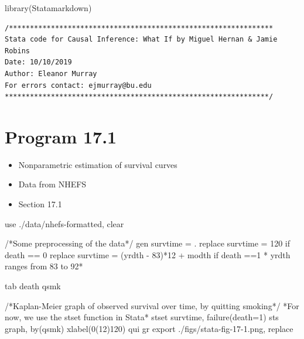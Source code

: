 \documentclass[
  10pt,
  a4paper,
]{book}
\newenvironment{Shaded}{\begin{snugshade}}{\end{snugshade}}
\newcommand{\CommentTok}[1]{\textcolor[rgb]{0.37,0.37,0.37}{#1}}
\newcommand{\FunctionTok}[1]{\textcolor[rgb]{0.28,0.35,0.67}{#1}}
\newcommand{\KeywordTok}[1]{\textcolor[rgb]{0.00,0.46,0.62}{#1}}
\newcommand{\NormalTok}[1]{\textcolor[rgb]{0.00,0.46,0.62}{#1}}
\providecommand{\tightlist}{%
  \setlength{\itemsep}{0pt}\setlength{\parskip}{0pt}}
\begin{document}
\begin{Shaded}
\begin{Highlighting}[]
\FunctionTok{library}\NormalTok{(Statamarkdown)}
\end{Highlighting}
\end{Shaded}

\begin{verbatim}
/***************************************************************
Stata code for Causal Inference: What If by Miguel Hernan & Jamie Robins
Date: 10/10/2019
Author: Eleanor Murray 
For errors contact: ejmurray@bu.edu
***************************************************************/
\end{verbatim}

\section{Program 17.1}\label{program-17.1-1}

\begin{itemize}
\tightlist
\item
  Nonparametric estimation of survival curves
\item
  Data from NHEFS
\item
  Section 17.1
\end{itemize}

\begin{Shaded}
\begin{Highlighting}[]
\KeywordTok{use}\NormalTok{ ./}\KeywordTok{data}\NormalTok{/nhefs{-}formatted, }\KeywordTok{clear}

\CommentTok{/*Some preprocessing of the data*/}
\KeywordTok{gen}\NormalTok{ survtime = .}
\KeywordTok{replace}\NormalTok{ survtime = 120 }\KeywordTok{if}\NormalTok{ death == 0}
\KeywordTok{replace}\NormalTok{ survtime = (yrdth {-} 83)*12 + modth }\KeywordTok{if}\NormalTok{ death ==1}
\NormalTok{* yrdth ranges from 83 to 92*}

\KeywordTok{tab}\NormalTok{ death qsmk}

\CommentTok{/*Kaplan{-}Meier graph of observed survival over time, by quitting smoking*/}
\NormalTok{*For now, we }\KeywordTok{use}\NormalTok{ the }\KeywordTok{stset} \KeywordTok{function} \KeywordTok{in}\NormalTok{ Stata*}
\KeywordTok{stset}\NormalTok{ survtime, failure(death=1)}
\KeywordTok{sts} \KeywordTok{graph}\NormalTok{, }\KeywordTok{by}\NormalTok{(qsmk) }\KeywordTok{xlabel}\NormalTok{(0(12)120)}
\KeywordTok{qui} \KeywordTok{gr} \KeywordTok{export}\NormalTok{ ./figs/stata{-}fig{-}17{-}1.png, }\KeywordTok{replace}
\end{Highlighting}
\end{Shaded}
\end{document}
